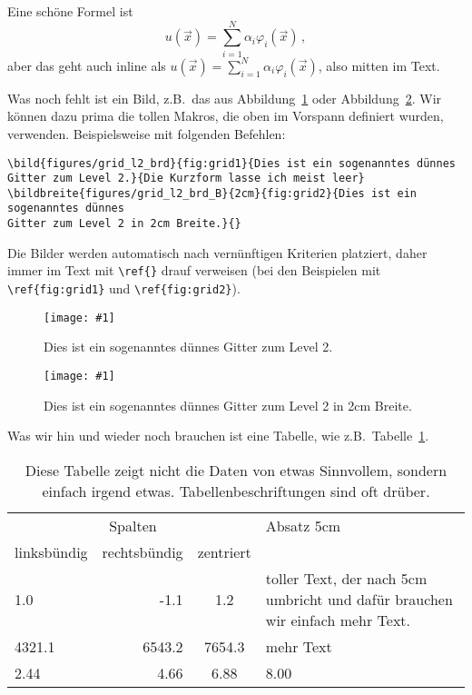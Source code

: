 \documentclass[a4paper,12pt]{llncs}
\numberwithin{equation}{section}
\newcommand{\bild}[4]{
  \begin{figure}[htbp]
    \begin{center}
      \texttt{[image: \#1]}
      \caption[#4]{#3}
      \label{#2}
    \end{center}
  \end{figure}
}
\newcommand{\bildbreite}[5]{
  \begin{figure}[htbp]
    \begin{center}
      \texttt{[image: \#1]}
      \caption[#5]{#4}
      \label{#3}
    \end{center}
  \end{figure}
}
\begin{document}
Eine schöne Formel ist
\[
u(\vec{x}) = \sum_{i=1}^N \alpha_i \varphi_i(\vec{x}) \,,
\]
aber das geht auch inline als $u(\vec{x}) = \sum_{i=1}^N \alpha_i
\varphi_i(\vec{x})$, also mitten im Text.

Was noch fehlt ist ein Bild, z.B.\ das aus
Abbildung~\ref{fig:grid1} oder Abbildung~\ref{fig:grid2}. Wir können dazu prima die tollen Makros,
die oben im Vorspann definiert wurden, verwenden. Beispielsweise mit
folgenden Befehlen:
\begin{verbatim}
\bild{figures/grid_l2_brd}{fig:grid1}{Dies ist ein sogenanntes dünnes
Gitter zum Level 2.}{Die Kurzform lasse ich meist leer}
\bildbreite{figures/grid_l2_brd_B}{2cm}{fig:grid2}{Dies ist ein sogenanntes dünnes
Gitter zum Level 2 in 2cm Breite.}{}
\end{verbatim}
Die Bilder werden automatisch nach vernünftigen Kriterien platziert,
daher immer im Text mit \verb!\ref{}! drauf verweisen (bei den
Beispielen mit \verb!\ref{fig:grid1}! und \verb!\ref{fig:grid2}!).
\bild{figures/grid_l2_brd}{fig:grid1}{Dies ist ein sogenanntes dünnes
  Gitter zum Level 2.}{Die Kurzform lasse ich meist leer}
\bildbreite{figures/grid_l2_brd}{2cm}{fig:grid2}{Dies ist ein sogenanntes dünnes
Gitter zum Level 2 in 2cm Breite.}{}

Was wir hin und wieder noch brauchen ist eine Tabelle, wie z.B.\
Tabelle~\ref{tab:irgendwas}.
\begin{table}[htbp]
  \centering
  \caption{Diese Tabelle zeigt nicht die Daten von etwas Sinnvollem,
    sondern einfach irgend etwas. Tabellenbeschriftungen sind oft drüber.}
  \label{tab:irgendwas}
  \begin{tabular}{lrcp{5cm}}
    \toprule
    \multicolumn{3}{c}{Spalten} & Absatz 5cm \\
    \cmidrule(lr){1-3}
    linksbündig & rechtsbündig & zentriert & \\
    \midrule
    1.0 & -1.1 & 1.2 & toller Text, der nach 5cm umbricht und dafür
    brauchen wir einfach mehr Text. \\
    4321.1 & 6543.2 & 7654.3 & mehr Text \\
    2.44 & 4.66 & 6.88 & 8.00 \\
    \bottomrule
  \end{tabular}
\end{table}
\end{document}
